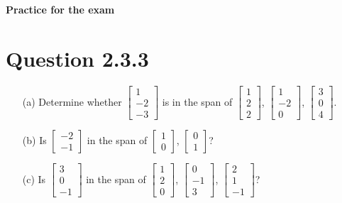 \documentclass[12pt]{article}
\begin{document}
\begin{center}
  \Large \textbf{Practice for the exam}
\end{center}

\section*{Question 2.3.3}
\begin{itemize}
    \item[(a)] Determine whether \(\begin{bmatrix} 1 \\ -2 \\ -3 \end{bmatrix}\) is in the span of \(\begin{bmatrix} 1 \\ 2 \\ 2 \end{bmatrix}\), \(\begin{bmatrix} 1 \\ -2 \\ 0 \end{bmatrix}\), \(\begin{bmatrix} 3 \\ 0 \\ 4 \end{bmatrix}\).
    \item[(b)] Is \(\begin{bmatrix} -2 \\ -1 \end{bmatrix}\) in the span of \(\begin{bmatrix} 1 \\ 0 \end{bmatrix}\), \(\begin{bmatrix} 0 \\ 1 \end{bmatrix}\)?
    \item[(c)] Is \(\begin{bmatrix} 3 \\ 0 \\ -1 \end{bmatrix}\) in the span of \(\begin{bmatrix} 1 \\ 2 \\ 0 \end{bmatrix}\), \(\begin{bmatrix} 0 \\ -1 \\ 3 \end{bmatrix}\), \(\begin{bmatrix} 2 \\ 1 \\ -1 \end{bmatrix}\)?
\end{itemize}
\end{document}
